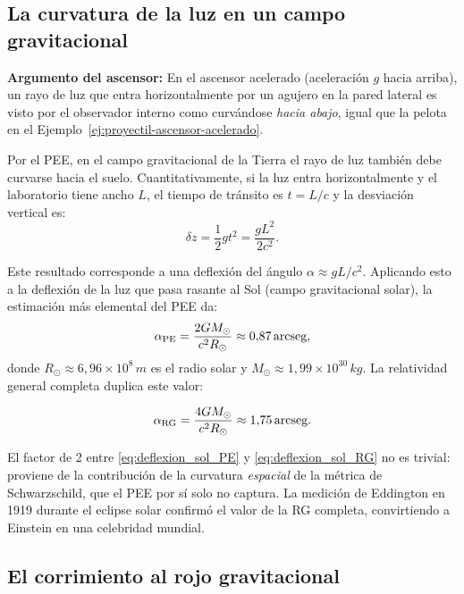 \subsection{La curvatura de la luz en un campo gravitacional}

\textbf{Argumento del ascensor:} En el ascensor acelerado (aceleración $g$ hacia arriba), un rayo de luz que entra horizontalmente por un agujero en la pared lateral es visto por el observador interno como curvándose \emph{hacia abajo}, igual que la pelota en el Ejemplo~\ref{ej:proyectil-ascensor-acelerado}.

Por el PEE, en el campo gravitacional de la Tierra el rayo de luz también debe curvarse hacia el suelo. Cuantitativamente, si la luz entra horizontalmente y el laboratorio tiene ancho $L$, el tiempo de tránsito es $t = L/c$ y la desviación vertical es:
\begin{equation}
  \delta z = \frac{1}{2}g t^2 = \frac{g L^2}{2c^2}.
  \label{eq:deflexion_luz_ascensor}
\end{equation}

Este resultado corresponde a una deflexión del ángulo $\alpha \approx g L/c^2$. Aplicando esto a la deflexión de la luz que pasa rasante al Sol (campo gravitacional solar), la estimación más elemental del PEE da:
\begin{equation}
  \alpha_{\rm PE} = \frac{2GM_\odot}{c^2 R_\odot} \approx 0{,}87\,\text{arcseg},
  \label{eq:deflexion_sol_PE}
\end{equation}
donde $R_\odot \approx 6{,}96\times10^8\,\si{m}$ es el radio solar y $M_\odot \approx 1{,}99\times10^{30}\,\si{kg}$. La relatividad general completa duplica este valor:

\begin{equation}
  \alpha_{\rm RG} = \frac{4GM_\odot}{c^2 R_\odot} \approx 1{,}75\,\text{arcseg}.
  \label{eq:deflexion_sol_RG}
\end{equation}

\begin{importante}
El factor de 2 entre \eqref{eq:deflexion_sol_PE} y \eqref{eq:deflexion_sol_RG} no es trivial: proviene de la contribución de la curvatura \emph{espacial} de la métrica de Schwarzschild, que el PEE por sí solo no captura. La medición de Eddington en 1919 durante el eclipse solar confirmó el valor de la RG completa, convirtiendo a Einstein en una celebridad mundial.
\end{importante}

\subsection{El corrimiento al rojo gravitacional}

